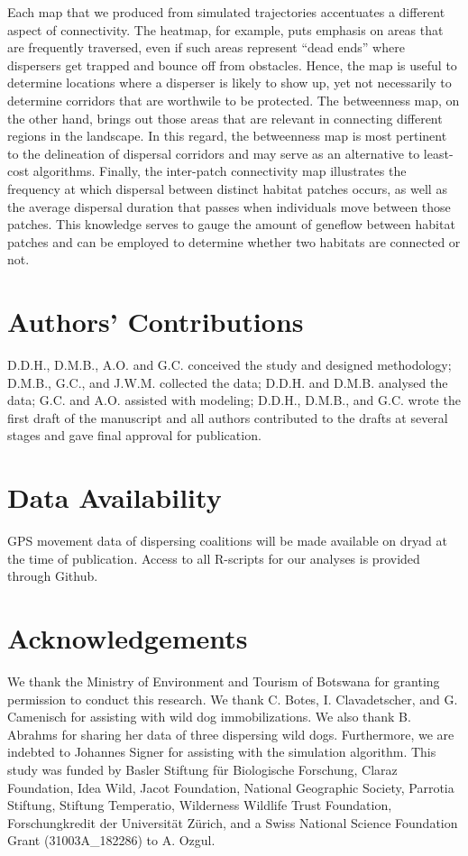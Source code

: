 \documentclass[abstract=on,10pt,a4paper,bibliography=totocnumbered]{article}
\begin{document}
Each map that we produced from simulated trajectories accentuates a different
aspect of connectivity. The heatmap, for example, puts emphasis on areas that
are frequently traversed, even if such areas represent ``dead ends'' where
dispersers get trapped and bounce off from obstacles. Hence, the map is useful
to determine locations where a disperser is likely to show up, yet not
necessarily to determine corridors that are worthwile to be protected. The
betweenness map, on the other hand, brings out those areas that are relevant in
connecting different regions in the landscape. In this regard, the betweenness
map is most pertinent to the delineation of dispersal corridors and may serve as
an alternative to least-cost algorithms. Finally, the inter-patch connectivity
map illustrates the frequency at which dispersal between distinct habitat
patches occurs, as well as the average dispersal duration that passes when
individuals move between those patches. This knowledge serves to gauge the
amount of geneflow between habitat patches and can be employed to determine
whether two habitats are connected or not.

\section{Authors' Contributions}
D.D.H., D.M.B., A.O. and G.C. conceived the study and designed methodology;
D.M.B., G.C., and J.W.M. collected the data; D.D.H. and D.M.B. analysed the
data; G.C. and A.O. assisted with modeling; D.D.H., D.M.B., and G.C. wrote the
first draft of the manuscript and all authors contributed to the drafts at
several stages and gave final approval for publication.

\section{Data Availability}
GPS movement data of dispersing coalitions will be made available on dryad at
the time of publication. Access to all R-scripts for our analyses is provided
through Github.

\section{Acknowledgements}
We thank the Ministry of Environment and Tourism of Botswana for granting
permission to conduct this research. We thank C. Botes, I. Clavadetscher, and G.
Camenisch for assisting with wild dog immobilizations. We also thank B. Abrahms
for sharing her data of three dispersing wild dogs. Furthermore, we are indebted
to Johannes Signer for assisting with the simulation algorithm. This study was
funded by Basler Stiftung für Biologische Forschung, Claraz Foundation, Idea
Wild, Jacot Foundation, National Geographic Society, Parrotia Stiftung, Stiftung
Temperatio, Wilderness Wildlife Trust Foundation, Forschungkredit der
Universität Zürich, and a Swiss National Science Foundation Grant
(31003A\_182286) to A. Ozgul.

\newpage
\begingroup
\singlespacing

\endgroup
\end{document}
